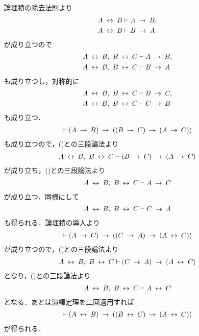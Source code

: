 	\begin{sketch}
		論理積の除去法則より
		\begin{align}
			A \lrarrow B &\vdash A \rarrow B, \\
			A \lrarrow B &\vdash B \rarrow A
		\end{align}
		が成り立つので
		\begin{align}
			A \lrarrow B,\ B \lrarrow C &\vdash A \rarrow B, 
			\label{fom:transitive_law_of_equivalence_symbol_1} \\
			A \lrarrow B,\ B \lrarrow C &\vdash B \rarrow A
		\end{align}
		も成り立つし，対称的に
		\begin{align}
			A \lrarrow B,\ B \lrarrow C &\vdash B \rarrow C, 
			\label{fom:transitive_law_of_equivalence_symbol_2} \\
			A \lrarrow B,\ B \lrarrow C &\vdash C \rarrow B
		\end{align}
		も成り立つ．
		\begin{align}
			\vdash (A \rarrow B) \rarrow ((B \rarrow C) \rarrow (A \rarrow C))
		\end{align}
		も成り立つので，()との三段論法より
		\begin{align}
			A \lrarrow B,\ B \lrarrow C \vdash (B \rarrow C) \rarrow (A \rarrow C)
		\end{align}
		が成り立ち，()との三段論法より
		\begin{align}
			A \lrarrow B,\ B \lrarrow C \vdash A \rarrow C
			\label{fom:transitive_law_of_equivalence_symbol_3}
		\end{align}
		が成り立つ．同様にして
		\begin{align}
			A \lrarrow B,\ B \lrarrow C \vdash C \rarrow A
			\label{fom:transitive_law_of_equivalence_symbol_4}
		\end{align}
		も得られる．論理積の導入より
		\begin{align}
			\vdash (A \rarrow C) \rarrow ((C \rarrow A) \rarrow (A \lrarrow C))
		\end{align}
		が成り立つので，()との三段論法より
		\begin{align}
			A \lrarrow B,\ B \lrarrow C \vdash (C \rarrow A) \rarrow (A \lrarrow C)
		\end{align}
		となり，()との三段論法より
		\begin{align}
			A \lrarrow B,\ B \lrarrow C \vdash A \lrarrow C
		\end{align}
		となる．あとは演繹定理を二回適用すれば
		\begin{align}
			\vdash (A \lrarrow B) \rarrow ((B \lrarrow C) \rarrow (A \lrarrow C))
		\end{align}
		が得られる．
		\QED
	\end{sketch}
	
